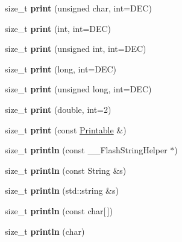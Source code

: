 \begin{DoxyCompactItemize}
size\+\_\+t {\bfseries print} (unsigned char, int=D\+EC)
\item 
\mbox{\label{classPrint_a32cb3cf32d701c797b2b2d1080052dfe}} 
size\+\_\+t {\bfseries print} (int, int=D\+EC)
\item 
\mbox{\label{classPrint_a87275de35583868a370f43ce1c887750}} 
size\+\_\+t {\bfseries print} (unsigned int, int=D\+EC)
\item 
\mbox{\label{classPrint_ab1fb2a2384c7b9f628943f5046e7d1c1}} 
size\+\_\+t {\bfseries print} (long, int=D\+EC)
\item 
\mbox{\label{classPrint_a26a40be7a557c0bc391a15dce9f06954}} 
size\+\_\+t {\bfseries print} (unsigned long, int=D\+EC)
\item 
\mbox{\label{classPrint_ae8b4c025786c820afe0a90aeea01c9c5}} 
size\+\_\+t {\bfseries print} (double, int=2)
\item 
\mbox{\label{classPrint_a901b0f06ae34aab31b8fbb4298f0596e}} 
size\+\_\+t {\bfseries print} (const \hyperlink{classPrintable}{Printable} \&)
\item 
\mbox{\label{classPrint_a4fd286b325d3b1a786cfa35072a8ef52}} 
size\+\_\+t {\bfseries println} (const \+\_\+\+\_\+\+Flash\+String\+Helper $\ast$)
\item 
\mbox{\label{classPrint_afd6cc6e2c1163f94c60855ad233899bd}} 
size\+\_\+t {\bfseries println} (const String \&s)
\item 
\mbox{\label{classPrint_afa9bc9d7f93e1fff0602afa6709351a0}} 
size\+\_\+t {\bfseries println} (std\+::string \&s)
\item 
\mbox{\label{classPrint_ad337ce3f7977411b7d34d47a51e5737e}} 
size\+\_\+t {\bfseries println} (const char\mbox{[}$\,$\mbox{]})
\item 
\mbox{\label{classPrint_a554896a71162f967b5794401239d7a01}} 
size\+\_\+t {\bfseries println} (char)
\item 
\mbox{\label{classPrint_ac9afe80f50f0118d735295aec7727e50}} 

\end{DoxyCompactItemize}
